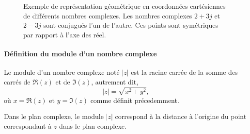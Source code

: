 \begin{figure}[!h]
\captionsetup{width=0.8\linewidth}
\begin{center}
\end{center}
    \caption{Exemple de représentation géométrique en coordonnées cartésiennes 
    de différents nombres complexes. Les nombres complexes $2+3j$ et $2-3j$
    sont conjugués l'un de l'autre. Ces points sont symétriques par rapport à l'axe des réel.
    \label{fig-plan_complexe}}
\end{figure}

\paragraph{Définition du module d'un nombre complexe}
Le module d'un nombre complexe noté $|z|$ est la 
racine carrée de la somme des carrés de $\Re(z)$ et de $\Im(z)$, 
autrement dit, 
$$
|z|=\sqrt{x^2+y^2},
$$
où $x=\Re(z)$ et $y=\Im(z)$ comme définit précedemment.

Dans le plan complexe, le module $|z|$ correspond à la distance à l'origine du 
point correspondant à $z$ dans le plan complexe.


